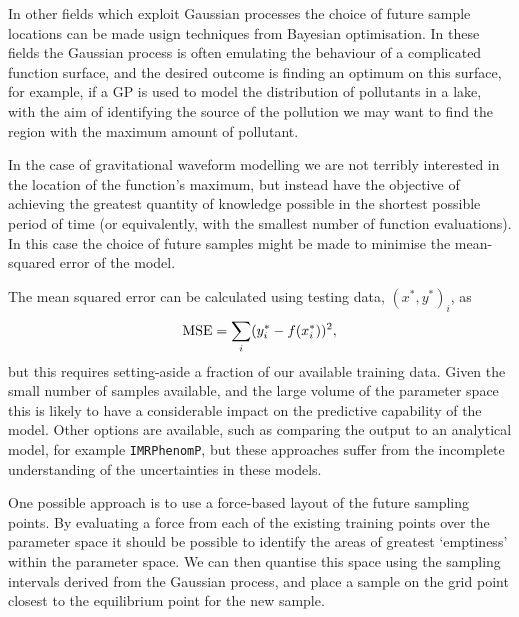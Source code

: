 \documentclass[a4paper]{article}
\begin{document}
In other fields which exploit Gaussian processes the choice of future
sample locations can be made usign techniques from Bayesian
optimisation. In these fields the Gaussian process is often emulating
the behaviour of a complicated function surface, and the desired
outcome is finding an optimum on this surface, for example, if a GP is
used to model the distribution of pollutants in a lake, with the aim
of identifying the source of the pollution we may want to find the
region with the maximum amount of pollutant. 

In the case of gravitational waveform modelling we are not terribly
interested in the location of the function's maximum, but instead have
the objective of achieving the greatest quantity of knowledge possible
in the shortest possible period of time (or equivalently, with the
smallest number of function evaluations). In this case the choice of
future samples might be made to minimise the mean-squared error of the
model.

The mean squared error can be calculated using testing data,
$(x^*, y^*)_i$, as
\begin{equation}
  \label{eq:mse}
  {\rm MSE} = \sum_i (y_i^* - f(x_i^*))^2,
\end{equation}
but this requires setting-aside a fraction of our available training
data. Given the small number of samples available, and the large
volume of the parameter space this is likely to have a considerable
impact on the predictive capability of the model. Other options are
available, such as comparing the output to an analytical model, for
example \texttt{IMRPhenomP}, but these approaches suffer from the
incomplete understanding of the uncertainties in these models.

One possible approach is to use a force-based layout of the future
sampling points. By evaluating a force from each of the existing
training points over the parameter space it should be possible to
identify the areas of greatest `emptiness' within the parameter
space. We can then quantise this space using the sampling intervals
derived from the Gaussian process, and place a sample on the grid
point closest to the equilibrium point for the new sample.
\end{document}
